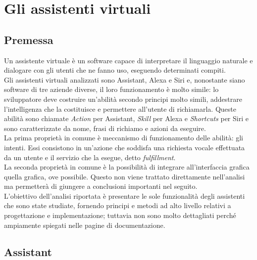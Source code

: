 
\chapter{Gli assistenti virtuali}
\label{cap:assistenti-virtuali}


\section{Premessa}
Un assistente virtuale è un software capace di interpretare il linguaggio naturale e dialogare con gli utenti che ne fanno uso, eseguendo determinati compiti. \\
Gli assistenti virtuali analizzati sono Assistant, Alexa e Siri e, nonostante siano software di tre aziende diverse, il loro funzionamento è molto simile: lo sviluppatore deve costruire un'abilità secondo principi molto simili, addestrare l'intelligenza che la costituisce e permettere all'utente di richiamarla. Queste abilità sono chiamate \emph{Action} per Assistant, \emph{Skill} per Alexa e \emph{Shortcuts} per Siri e sono caratterizzate da nome, frasi di richiamo e azioni da eseguire. \\
La prima proprietà in comune è meccanismo di funzionamento delle abilità: gli intenti. Essi consistono in un'azione che soddisfa una richiesta vocale effettuata da un utente e il servizio che la esegue, detto \emph{fulfillment}. \\
La seconda proprietà in comune è la possibilità di integrare all'interfaccia grafica quella grafica, ove possibile. Questo non viene trattato direttamente nell'analisi ma permetterà di giungere a conclusioni importanti nel seguito. \\
L'obiettivo dell'analisi riportata è presentare le sole funzionalità degli assistenti che sono state studiate, fornendo principi e metodi ad alto livello relativi a progettazione e implementazione; tuttavia non sono molto dettagliati perché ampiamente spiegati nelle pagine di documentazione.

\section{Assistant}
